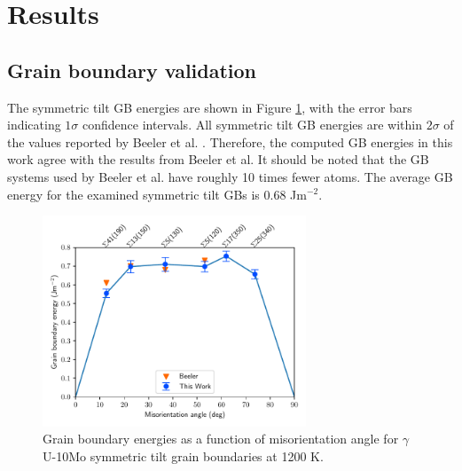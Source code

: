 \documentclass{elsarticle}
\providecommand{\DIFadd}[1]{{\protect\color{blue} \sf #1}} %
\providecommand{\DIFdel}[1]{}
\providecommand{\DIFaddbegin}{} %
\providecommand{\DIFaddend}{} %
\providecommand{\DIFdelbegin}{} %
\providecommand{\DIFdelend}{} %
\begin{document}
\section{Results}

\subsection{Grain boundary validation}

\DIFdelbegin \DIFdel{To check the validity of the constructed systems, GB energies for $\gamma$U-10Mo GBs are calculated to compare against literature values. The systems are relaxed over 100 ps in an NPT ensemble at 1200 K, with energies averaged over the final 50 ps, with 25 unique simulations performed for each GB system. The }\DIFdelend \DIFaddbegin \DIFadd{The }\DIFaddend symmetric tilt GB energies are shown in Figure \ref{fig:gbe}, with the error bars indicating $1\sigma$ confidence intervals. All symmetric tilt GB energies are within $2\sigma$ of the values reported \DIFdelbegin \DIFdel{in }\DIFdelend \DIFaddbegin \DIFadd{by }\DIFaddend Beeler et al. \cite{beeler2018}. Therefore, the computed GB energies in this work agree with the results from Beeler et al. It should be noted that the GB systems used by Beeler et al. have roughly 10 times fewer atoms. The average GB energy for the examined symmetric tilt GBs is 0.68 Jm$^{-2}$.

\begin{figure}[!ht]
\centering
\includegraphics[width=0.70\textwidth]{gbe.pdf}
\caption{Grain boundary energies as a function of misorientation angle for $\gamma$U-10Mo symmetric tilt grain boundaries at 1200 K.}
\label{fig:gbe}
\end{figure}
\end{document}
